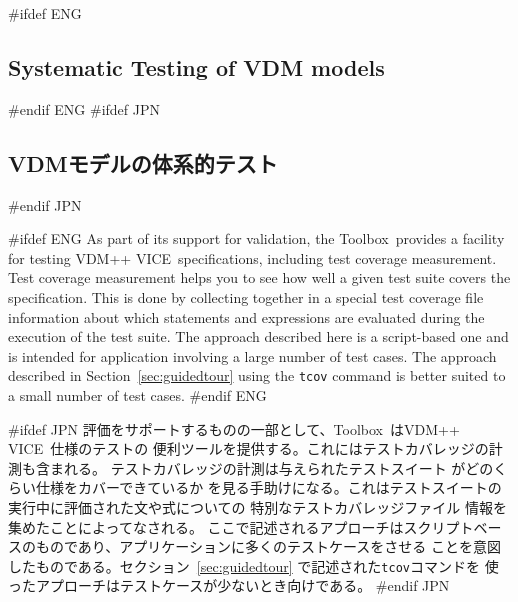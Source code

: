 \documentclass[\pformat,12pt]{article}
\newcommand{\vdmslpp}{VDM-SL}
\newcommand{\Toolbox}{Toolbox}
\newcommand{\vdmslpp}{VDM++}
\newcommand{\Toolbox}{Toolbox}
\renewcommand{\vdmslpp}{VDM++ VICE}
\begin{document}
\newpage
#ifdef ENG
\subsection{Systematic Testing of VDM models}\label{sec:testing}
\label{vdmtc} 
#endif ENG
#ifdef JPN
\subsection{VDMモデルの体系的テスト}\label{sec:testing}
\label{vdmtc} 
#endif JPN

#ifdef ENG
As part of its support for validation, the \Toolbox\ provides a
facility for testing \vdmslpp\ specifications, including test
  coverage measurement.  Test coverage measurement helps you to see
how well a given test suite covers the
specification. This is done by collecting together in a special 
test coverage file information  about which
statements and expressions are 
evaluated during the execution of the test suite. The approach
described here is a script-based one and is intended for application
involving a large number of test cases. The approach described in
Section~\ref{sec:guidedtour} using the \texttt{tcov} command is better
suited to a small number of test cases.
#endif ENG

#ifdef JPN
評価をサポートするものの一部として、\Toolbox\ は\vdmslpp\ 仕様のテストの
便利ツールを提供する。これにはテストカバレッジの計測も含まれる。
テストカバレッジの計測は与えられたテストスイート
 がどのくらい仕様をカバーできているか
を見る手助けになる。これはテストスイートの実行中に評価された文や式についての
特別なテストカバレッジファイル 情報を集めたことによってなされる。
ここで記述されるアプローチはスクリプトベースのものであり、アプリケーションに多くのテストケースをさせる
ことを意図したものである。セクション~\ref{sec:guidedtour} で記述された\texttt{tcov}コマンドを
使ったアプローチはテストケースが少ないとき向けである。
#endif JPN
\end{document}
